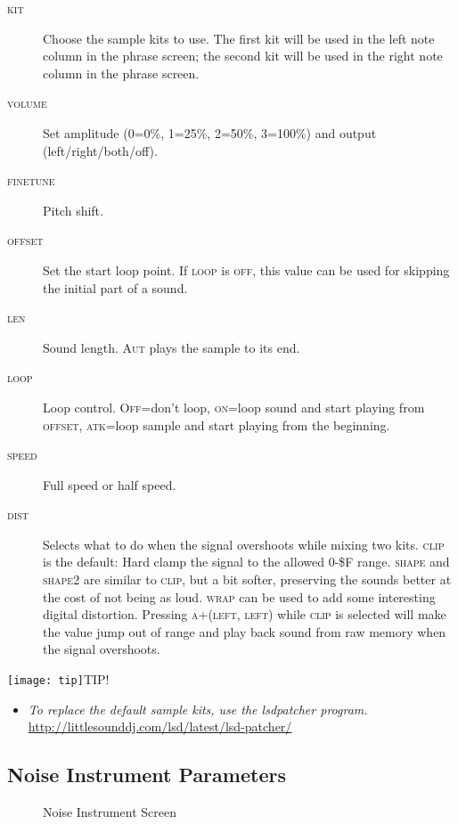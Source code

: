 \begin{description}
	\item[\textsc{kit}] Choose the sample kits to use. The first kit will be used in the left note column in the phrase screen; the second kit will be used in the right note column in the phrase screen.
    \item[\textsc{volume}] Set amplitude (0=0\%, 1=25\%, 2=50\%, 3=100\%) and output (left/right/both/off).
	\item[\textsc{finetune}] Pitch shift.
	\item[\textsc{offset}] Set the start loop point. If \textsc{loop} is \textsc{off}, this value can be used for skipping the initial part of a sound.
	\item[\textsc{len}] Sound length. \textsc{Aut} plays the sample to its end.
	\item[\textsc{loop}] Loop control. \textsc{Off}=don't loop, \textsc{on}=loop sound and start playing from \textsc{offset}, \textsc{atk}=loop sample and start playing from the beginning.
	\item[\textsc{speed}] Full speed or half speed.
	\item[\textsc{dist}] Selects what to do when the signal overshoots while mixing two kits. \textsc{clip} is the default: Hard clamp the signal to the allowed 0-\$F range. \textsc{shape} and \textsc{shape2} are similar to \textsc{clip}, but a bit softer, preserving the sounds better at the cost of not being as loud. \textsc{wrap} can be used to add some interesting digital distortion. Pressing \textsc{a+(left, left)} while \textsc{clip} is selected will make the value jump out of range and play back sound from raw memory when the signal overshoots.
\end{description}

\texttt{[image: tip]}TIP!
\begin{itemize}
\item \textit{To replace the default sample kits, use the lsdpatcher program.} \url{http://littlesounddj.com/lsd/latest/lsd-patcher/}
\end{itemize}

\subsection{Noise Instrument Parameters}
\label{noise-instrument-parameters}

\begin{figure}[htpb]
	\begin{center}
	\end{center}
	\caption{Noise Instrument Screen}
	\label{fig:instr-noise}
\end{figure}

